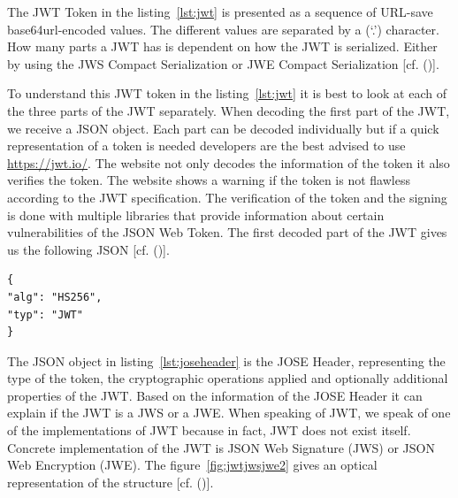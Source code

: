 \goodbreak

The JWT Token in the listing~\ref{lst:jwt} is presented as a sequence of URL-save base64url-encoded values. The different values are separated by a (‘.’) character. How many parts a JWT has is dependent on how the JWT is serialized. Either by using the JWS Compact Serialization or JWE Compact Serialization [cf. (\cite{JWT:IETF:Jones:2015})].


To understand this JWT token in the listing~\ref{lst:jwt} it is best to look at each of the three parts of the JWT separately. When decoding the first part of the JWT, we receive a JSON object. Each part can be decoded individually but if a quick representation of a token is needed developers are the best advised to use \href{https://jwt.io/} {https://jwt.io/}. The website not only decodes the information of the token it also verifies the token. The website shows a warning if the token is not flawless according to the JWT specification. The verification of the token and the signing is done with multiple libraries that provide information about certain vulnerabilities of the JSON Web Token. The first decoded part of the JWT gives us the following JSON [cf. (\cite{JWT:IETF:Jones:2015})].


\begin{lstlisting}
{
"alg": "HS256",
"typ": "JWT"
}
\end{lstlisting}


The JSON object in listing~\ref{lst:joseheader} is the JOSE Header, representing the type of the token, the cryptographic operations applied and optionally additional properties of the JWT. Based on the information of the JOSE Header it can explain if the JWT is a JWS or a JWE. When speaking of JWT, we speak of one of the implementations of JWT because in fact, JWT does not exist itself. Concrete implementation of the JWT is JSON Web Signature (JWS) or JSON Web Encryption (JWE). The figure~\ref{fig:jwtjwsjwe2} gives an optical representation of the structure [cf. (\cite{Siriwardena:JWTJWSJWE:2016})].


